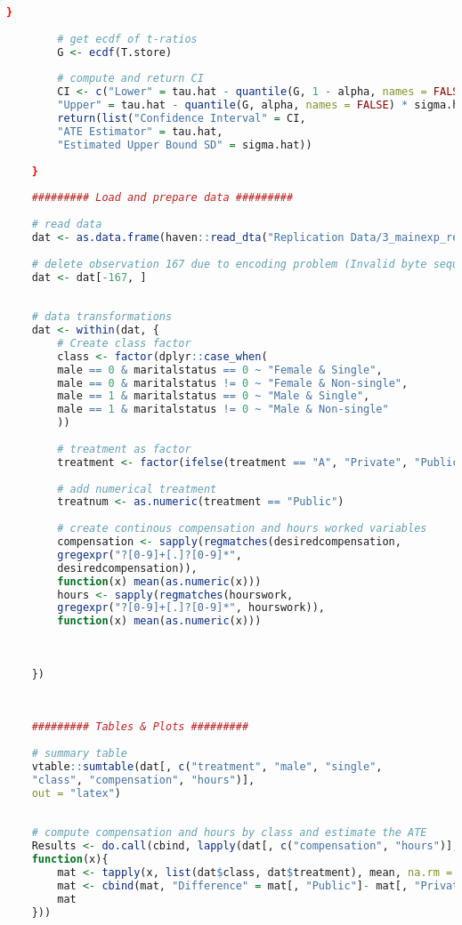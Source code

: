 \documentclass[aodsor,preprint]{imsart}
\numberwithin{equation}{section}
\theoremstyle{plain}
\begin{document}
\begin{lstlisting}[language=R, basicstyle=\tiny]
		}
		
		# get ecdf of t-ratios
		G <- ecdf(T.store)
		
		# compute and return CI
		CI <- c("Lower" = tau.hat - quantile(G, 1 - alpha, names = FALSE) * sigma.hat / sqrt(n),
		"Upper" = tau.hat - quantile(G, alpha, names = FALSE) * sigma.hat / sqrt(n))
		return(list("Confidence Interval" = CI,
		"ATE Estimator" = tau.hat,
		"Estimated Upper Bound SD" = sigma.hat))
		
	}
	
	######### Load and prepare data ######### 
	
	# read data
	dat <- as.data.frame(haven::read_dta("Replication Data/3_mainexp_responses.dta"))
	
	# delete observation 167 due to encoding problem (Invalid byte sequence)
	dat <- dat[-167, ]
	
	
	# data transformations
	dat <- within(dat, {
		# Create class factor
		class <- factor(dplyr::case_when(
		male == 0 & maritalstatus == 0 ~ "Female & Single",
		male == 0 & maritalstatus != 0 ~ "Female & Non-single",
		male == 1 & maritalstatus == 0 ~ "Male & Single",
		male == 1 & maritalstatus != 0 ~ "Male & Non-single"
		))
		
		# treatment as factor
		treatment <- factor(ifelse(treatment == "A", "Private", "Public"))
		
		# add numerical treatment
		treatnum <- as.numeric(treatment == "Public")
		
		# create continous compensation and hours worked variables
		compensation <- sapply(regmatches(desiredcompensation, 
		gregexpr("?[0-9]+[.]?[0-9]*",
		desiredcompensation)),
		function(x) mean(as.numeric(x)))
		hours <- sapply(regmatches(hourswork,
		gregexpr("?[0-9]+[.]?[0-9]*", hourswork)),
		function(x) mean(as.numeric(x)))
		
		
		
	})
	
	
	
	######### Tables & Plots #########
	
	# summary table
	vtable::sumtable(dat[, c("treatment", "male", "single",
	"class", "compensation", "hours")],
	out = "latex")
	
	
	# compute compensation and hours by class and estimate the ATE
	Results <- do.call(cbind, lapply(dat[, c("compensation", "hours")],
	function(x){
		mat <- tapply(x, list(dat$class, dat$treatment), mean, na.rm = TRUE)
		mat <- cbind(mat, "Difference" = mat[, "Public"]- mat[, "Private"])
		mat
	}))
	

\end{lstlisting}
\end{document}
